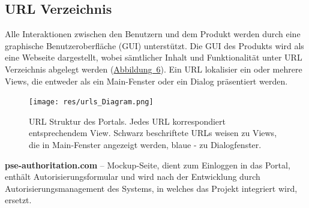 \documentclass[parskip=full,11pt]{scrartcl}
\begin{document}
 \newpage
  \subsection{URL Verzeichnis}
Alle Interaktionen zwischen den Benutzern und dem Produkt werden durch eine graphische Benutzeroberfläche (GUI) unterstützt. Die \gls{GUI} des Produkts wird als eine Webseite dargestellt, wobei sämtlicher Inhalt und Funktionalität unter URL Verzeichnis abgelegt werden (\hyperref[URL Struktur]{\mbox{Abbildung 6}}). Ein URL lokalisier ein oder mehrere Views, die entweder als ein Main-Fenster oder ein Dialog präsentiert werden.  

\begin{figure}[ht!]
 	\centering
 	\texttt{[image: res/urls\_Diagram.png]}
 	\caption{URL Struktur des Portals. Jedes URL korrespondiert entsprechendem View. Schwarz beschriftete URLs weisen zu Views, die in Main-Fenster angezeigt werden, blaue - zu Dialogfenster. }
 	\label{URL-Struktur}
 \end{figure}
 
\textbf{pse-authoritation.com} – Mockup-Seite, dient zum Einloggen in das Portal, enthält Autorisierungsformular und wird nach der Entwicklung durch Autorisierungsmanagement des Systems, in welches das Projekt integriert wird, ersetzt. 
 
\end{document}
